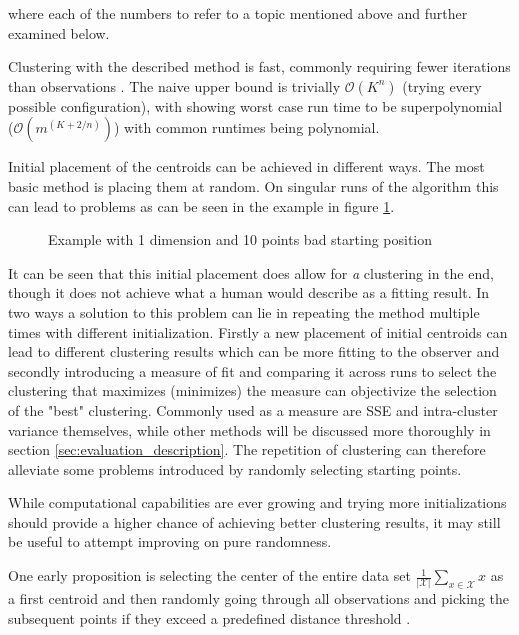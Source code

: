 where each of the numbers  to  refer to a topic mentioned above and further examined below.

Clustering with the described method is fast, commonly requiring fewer iterations than observations \cite{har2005fast}. The naive upper bound is trivially $\mathcal{O}(K^{n})$ (trying every possible configuration), with \cite{arthur2006slow} showing worst case run time to be superpolynomial ($\mathcal{O}(m^{(K+2/n)})$) with common runtimes being polynomial.

 Initial placement of the centroids can be achieved in different ways. The most basic method is placing them at random. On singular runs of the algorithm this can lead to problems as can be seen in the example in figure \ref{img:k_means_bad_init}.

\begin{figure}[h]
\caption{Example with 1 dimension and 10 points bad starting position}
\label{img:k_means_bad_init}
\end{figure}

It can be seen that this initial placement does allow for \textit{a} clustering in the end, though it does not achieve what a human would describe as a fitting result. In two ways a solution to this problem can lie in repeating the method multiple times with different initialization. Firstly a new placement of initial centroids can lead to different clustering results which can be more fitting to the observer and secondly introducing a measure of fit and comparing it across runs to select the clustering that maximizes (minimizes) the measure can objectivize the selection of the "best" clustering. Commonly used as a measure are SSE and intra-cluster variance themselves, while other methods will be discussed more thoroughly in section \ref{sec:evaluation_description}. The repetition of clustering can therefore alleviate some problems introduced by randomly selecting starting points.

While computational capabilities are ever growing and trying more initializations should provide a higher chance of achieving better clustering results, it may still be useful to attempt improving on pure randomness.

One early proposition is selecting the center of the entire data set $\frac{1}{\left | \mathcal{X} \right |} \sum_{x \in \mathcal{X}}^{} x $ as a first centroid and then randomly going through all observations and picking the subsequent points if they exceed a predefined distance threshold \cite{ball1967clustering}.

